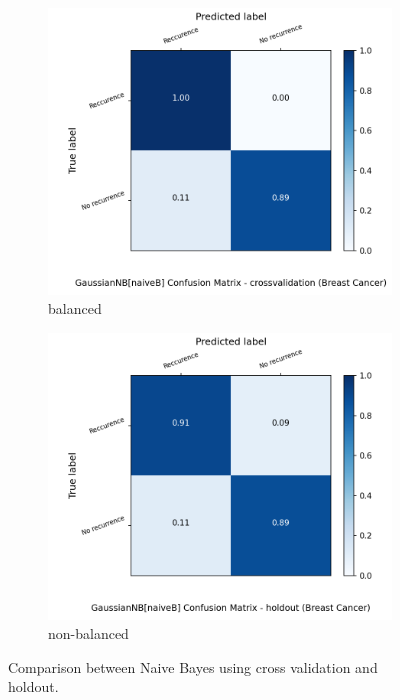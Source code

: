 \documentclass{article}
\begin{document}
\begin{figure}[H]
	\centering
	\begin{subfigure}{.5\textwidth}
		\centering
		\includegraphics[width=1.1\textwidth]{Plots/breastCancer_GaussianNB_naiveB_balance_True_crossvalidation.png}
		\caption{balanced}
	\end{subfigure}%
	\begin{subfigure}{.5\textwidth}
		\centering
		\includegraphics[width=1.1\textwidth]{Plots/breastCancer_GaussianNB_naiveB_balance_True_holdout.png}
		\caption{non-balanced}
	\end{subfigure}
	\caption{Comparison between Naive Bayes using cross validation and holdout.}
\end{figure}
\end{document}
